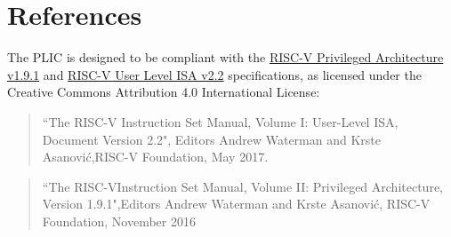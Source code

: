 \section{References}

The PLIC is designed to be compliant with the
\href{https://people.eecs.berkeley.edu/\%7Ekrste/papers/riscv-privileged-v1.9.1.pdf}{RISC-V
Privileged Architecture v1.9.1} and
\href{https://github.com/riscv/riscv-isa-manual/releases/download/riscv-user-2.2/riscv-spec-v2.2.pdf}{RISC-V
User Level ISA v2.2} specifications, as licensed under the Creative
Commons Attribution 4.0 International License:

\begin{quote}
``The RISC-V Instruction Set Manual, Volume I: User-Level ISA, Document
Version 2.2", Editors Andrew Waterman and Krste Asanović,RISC-V
Foundation, May 2017.
\end{quote}

\begin{quote}
``The RISC-VInstruction Set Manual, Volume II: Privileged Architecture,
Version 1.9.1",Editors Andrew Waterman and Krste Asanović, RISC-V
Foundation, November 2016
\end{quote}
